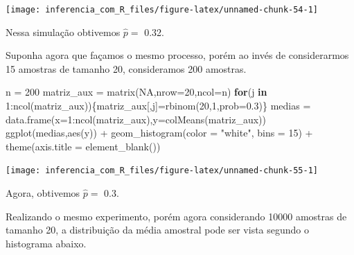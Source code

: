 \documentclass[
]{book}
\newenvironment{Shaded}{\begin{snugshade}}{\end{snugshade}}
\newcommand{\AttributeTok}[1]{\textcolor[rgb]{0.77,0.63,0.00}{#1}}
\newcommand{\ConstantTok}[1]{\textcolor[rgb]{0.00,0.00,0.00}{#1}}
\newcommand{\ControlFlowTok}[1]{\textcolor[rgb]{0.13,0.29,0.53}{\textbf{#1}}}
\newcommand{\DecValTok}[1]{\textcolor[rgb]{0.00,0.00,0.81}{#1}}
\newcommand{\FloatTok}[1]{\textcolor[rgb]{0.00,0.00,0.81}{#1}}
\newcommand{\FunctionTok}[1]{\textcolor[rgb]{0.00,0.00,0.00}{#1}}
\newcommand{\NormalTok}[1]{#1}
\newcommand{\OtherTok}[1]{\textcolor[rgb]{0.56,0.35,0.01}{#1}}
\newcommand{\SpecialCharTok}[1]{\textcolor[rgb]{0.00,0.00,0.00}{#1}}
\newcommand{\StringTok}[1]{\textcolor[rgb]{0.31,0.60,0.02}{#1}}
\begin{document}
\begin{center}\texttt{[image: inferencia\_com\_R\_files/figure-latex/unnamed-chunk-54-1]} \end{center}

Nessa simulação obtivemos \(\hat p =\) 0.32.

Suponha agora que façamos o mesmo processo, porém ao invés de considerarmos 15 amostras de tamanho 20, consideramos 200 amostras.

\begin{Shaded}
\begin{Highlighting}[]
\NormalTok{n }\OtherTok{=} \DecValTok{200}
\NormalTok{matriz\_aux }\OtherTok{=} \FunctionTok{matrix}\NormalTok{(}\ConstantTok{NA}\NormalTok{,}\AttributeTok{nrow=}\DecValTok{20}\NormalTok{,}\AttributeTok{ncol=}\NormalTok{n)}
\ControlFlowTok{for}\NormalTok{(j }\ControlFlowTok{in} \DecValTok{1}\SpecialCharTok{:}\FunctionTok{ncol}\NormalTok{(matriz\_aux))\{matriz\_aux[,j]}\OtherTok{=}\FunctionTok{rbinom}\NormalTok{(}\DecValTok{20}\NormalTok{,}\DecValTok{1}\NormalTok{,}\AttributeTok{prob=}\FloatTok{0.3}\NormalTok{)\}}
\NormalTok{medias }\OtherTok{=} \FunctionTok{data.frame}\NormalTok{(}\AttributeTok{x=}\DecValTok{1}\SpecialCharTok{:}\FunctionTok{ncol}\NormalTok{(matriz\_aux),}\AttributeTok{y=}\FunctionTok{colMeans}\NormalTok{(matriz\_aux))}
\FunctionTok{ggplot}\NormalTok{(medias,}\FunctionTok{aes}\NormalTok{(y)) }\SpecialCharTok{+}
  \FunctionTok{geom\_histogram}\NormalTok{(}\AttributeTok{color =} \StringTok{"white"}\NormalTok{, }\AttributeTok{bins =} \DecValTok{15}\NormalTok{) }\SpecialCharTok{+}
  \FunctionTok{theme}\NormalTok{(}\AttributeTok{axis.title =} \FunctionTok{element\_blank}\NormalTok{())}
\end{Highlighting}
\end{Shaded}

\begin{center}\texttt{[image: inferencia\_com\_R\_files/figure-latex/unnamed-chunk-55-1]} \end{center}

Agora, obtivemos \(\hat p =\) 0.3.

Realizando o mesmo experimento, porém agora considerando 10000 amostras de tamanho 20, a distribuição da média amostral pode ser vista segundo o histograma abaixo.
\end{document}
